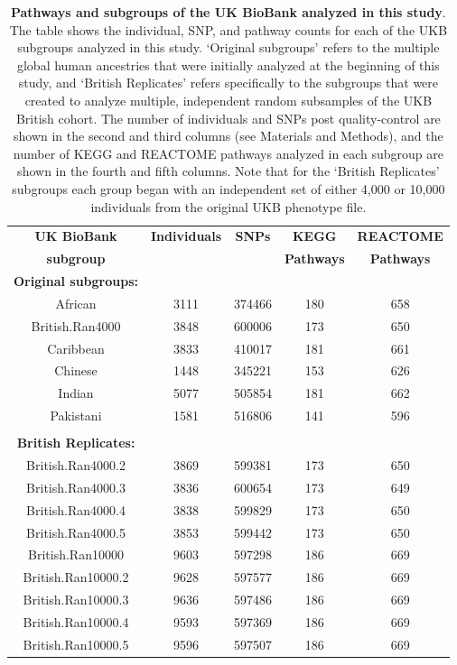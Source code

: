 \documentclass[12pt,a4paper]{article}
\begin{document}
\begin{table}[ht]
\centering
\begin{tabular}{ccccc}
  \hline
\textbf{UK BioBank} & \textbf{Individuals} & \textbf{SNPs} & \textbf{KEGG} & \textbf{REACTOME} \\
\textbf{subgroup} & & & \textbf{Pathways} & \textbf{Pathways}  \\
  \hline
\textbf{Original subgroups:} & & & & \\
African & 3111 & 374466 & 180 & 658 \\ 
British.Ran4000 & 3848 & 600006 & 173 & 650 \\ 
Caribbean & 3833 & 410017 & 181 & 661 \\ 
Chinese & 1448 & 345221 & 153 & 626 \\ 
Indian & 5077 & 505854 & 181 & 662 \\ 
Pakistani & 1581 & 516806 & 141 & 596 \\ 
\\
\textbf{British Replicates:} & & & & \\
British.Ran4000.2 & 3869 & 599381 & 173 & 650 \\ 
British.Ran4000.3 & 3836 & 600654 & 173 & 649 \\ 
British.Ran4000.4 & 3838 & 599829 & 173 & 650 \\ 
British.Ran4000.5 & 3853 & 599442 & 173 & 650 \\ 
British.Ran10000 & 9603 & 597298 & 186 & 669 \\ 
British.Ran10000.2 & 9628 & 597577 & 186 & 669 \\ 
British.Ran10000.3 & 9636 & 597486 & 186 & 669 \\ 
British.Ran10000.4 & 9593 & 597369 & 186 & 669 \\ 
British.Ran10000.5 & 9596 & 597507 & 186 & 669 \\ 
  \hline
\end{tabular}
\caption[TBD]{\textbf{Pathways and subgroups of the UK BioBank analyzed in this study}. The table shows the individual, SNP, and pathway counts for each of the UKB subgroups analyzed in this study. `Original subgroups' refers to the multiple global human ancestries that were initially analyzed at the beginning of this study, and `British Replicates' refers specifically to the subgroups that were created to analyze multiple, independent random subsamples of the UKB British cohort. The number of individuals and SNPs post quality-control are shown in the second and third columns (see Materials and Methods), and the number of KEGG and REACTOME pathways analyzed in each subgroup are shown in the fourth and fifth columns. Note that for the `British Replicates' subgroups each group began with an independent set of either 4,000 or 10,000 individuals from the original UKB phenotype file.}
\label{InterPath-Supp-Table-UKBPopStats}
\end{table}
\clearpage
\end{document}
